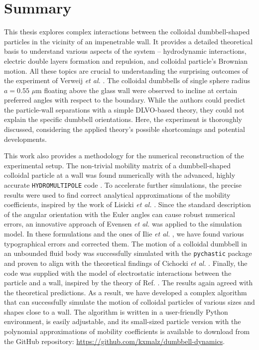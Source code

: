 \documentclass{master_thesis}
\def\code#1{\texttt{#1}}
\begin{document}
\chapter{Summary} \label{chapter:summary}

This thesis explores complex interactions between the colloidal dumbbell-shaped particles in the vicinity of an impenetrable wall. It provides a detailed theoretical basis to understand various aspects of the system -- hydrodynamic interactions, electric double layers formation and repulsion, and colloidal particle's Brownian motion. All these topics are crucial to understanding the surprising outcomes of the experiment of Verweij \textit{et al.} \cite{verweij2021}. The colloidal dumbbells of single sphere radius $a=0.55$ $\mu$m floating above the glass wall were observed to incline at certain preferred angles with respect to the boundary. While the authors could predict the particle-wall separations with a simple DLVO-based theory, they could not explain the specific dumbbell orientations. Here, the experiment is thoroughly discussed, considering the applied theory's possible shortcomings and potential developments.

This work also provides a methodology for the numerical reconstruction of the experimental setup. The non-trivial mobility matrix of a dumbbell-shaped colloidal particle at a wall was found numerically with the advanced, highly accurate \code{HYDROMULTIPOLE} code \cite{ekiel_2009}. To accelerate further simulations, the precise results were used to find correct analytical approximations of the mobility coefficients, inspired by the work of Lisicki \textit{et al.} \cite{lisicki2016}. Since the standard description of the angular orientation with the Euler angles can cause robust numerical errors, an innovative approach of Evensen \textit{et al.} \cite{evensen2008} was applied to the simulation model. In these formulations and the ones of Ilie \textit{et al.} \cite{ilie2014}, we have found various typographical errors and corrected them. The motion of a colloidal dumbbell in an unbounded fluid body was successfully simulated with the \code{pychastic} package \cite{waszkiewicz2023} and proven to align with the theoretical findings of Cichocki \textit{et al.} \cite{cichocki2015}. Finally, the code was supplied with the model of electrostatic interactions between the particle and a wall, inspired by the theory of Ref. \cite{verweij2021}. The results again agreed with the theoretical predictions. As a result, we have developed a complex algorithm that can successfully simulate the motion of colloidal particles of various sizes and shapes close to a wall. The algorithm is written in a user-friendly Python environment, is easily adjustable, and its small-sized particle version with the polynomial approximations of mobility coefficients is available to download from the GitHub repository: \url{https://github.com/kxmalz/dumbbell-dynamics}.
\end{document}
